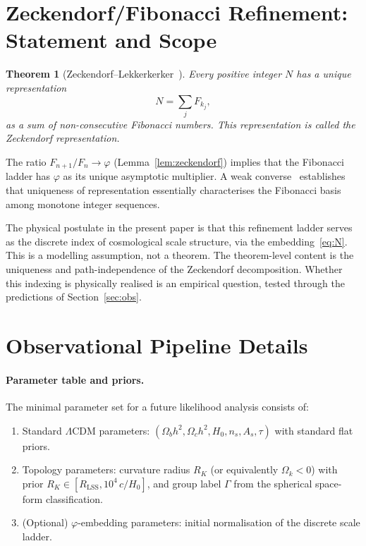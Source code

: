 \documentclass[12pt,a4paper]{article}
\newtheorem{theorem}{Theorem}[section]
\newcommand{\RK}{R_K}
\begin{document}
\section{Zeckendorf/Fibonacci Refinement: Statement and
         Scope}
\label{app:zeckendorf}

\begin{theorem}[Zeckendorf--Lekkerkerker~\protect\cite{Lekkerkerker1951,Keller1972}]
Every positive integer $N$ has a unique representation
\begin{equation}
  N = \sum_{j} F_{k_j},
  \label{eq:zeckendorf}
\end{equation}
as a sum of non-consecutive Fibonacci numbers. This
representation is called the Zeckendorf representation.
\end{theorem}

The ratio $F_{n+1}/F_n \to \varphi$ (Lemma~\ref{lem:zeckendorf})
implies that the Fibonacci ladder has $\varphi$ as its
unique asymptotic multiplier. A weak converse~\cite{Chang2020}
establishes that uniqueness of representation essentially
characterises the Fibonacci basis among monotone integer
sequences.

The physical postulate in the present paper is that this
refinement ladder serves as the discrete index of
cosmological scale structure, via the embedding~\eqref{eq:N}.
This is a modelling assumption, not a theorem. The
theorem-level content is the uniqueness and
path-independence of the Zeckendorf decomposition.
Whether this indexing is physically realised is an
empirical question, tested through the predictions of
Section~\ref{sec:obs}.

\section{Observational Pipeline Details}
\label{app:pipeline}

\paragraph{Parameter table and priors.}
The minimal parameter set for a future likelihood
analysis consists of:
\begin{enumerate}
\item Standard $\Lambda$CDM parameters:
  $(\Omega_b h^2, \Omega_c h^2, H_0, n_s, A_s, \tau)$
  with standard flat priors.
\item Topology parameters: curvature radius $\RK$ (or
  equivalently $\Omega_k < 0$) with prior
  $\RK \in [R_{\mathrm{LSS}}, 10^4\,c/H_0]$, and group
  label $\Gamma$ from the spherical space-form
  classification.
\item (Optional) $\varphi$-embedding parameters:
  initial normalisation of the discrete scale ladder.
\end{enumerate}
\end{document}
